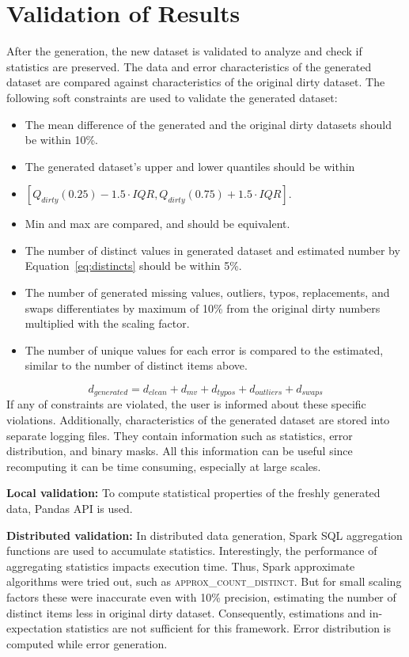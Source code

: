 \section{Validation of Results}
\label{sec:validation}
After the generation, the new dataset is validated to analyze and check if statistics are preserved. 
The data and error characteristics of the generated dataset are compared against characteristics of the original dirty dataset.
The following soft constraints are used to validate the generated dataset:
\begin{itemize}
    \item The mean difference of the generated and the original dirty datasets should be within 10\%.
    \item The generated dataset's upper and lower quantiles should be within 
    \item[~]$[Q_{dirty}(0.25) - 1.5\cdot IQR, Q_{dirty}(0.75) + 1.5\cdot IQR]$.
    \item Min and max are compared, and should be equivalent.
    \item The number of distinct values in generated dataset and estimated number by Equation~\ref{eq:distincts} should be within 5\%.
    \item The number of generated missing values, outliers, typos, replacements, and swaps differentiates by maximum  of 10\% from the original dirty numbers multiplied with the scaling factor.
    \item The number of unique values for each error is compared to the estimated, similar to the number of distinct items above.
\end{itemize}

\begin{equation}
\label{eq:distincts}
d_{generated} = d_{clean} + d_{mv} + d_{typos} + d_{outliers} + d_{swaps}
\end{equation}
If any of constraints are violated, the user is informed about these specific violations. 
Additionally, characteristics of the generated dataset are stored into separate logging files. 
They contain information such as statistics, error distribution, and binary masks.
All this information can be useful since recomputing it can be time consuming, especially at large scales.

\textbf{Local validation:} To compute statistical properties of the freshly generated data, Pandas API is used.

\textbf{Distributed validation:} 
In distributed data generation, Spark SQL aggregation functions are used to accumulate statistics.
Interestingly, the performance of aggregating statistics impacts execution time. 
Thus, Spark approximate algorithms were tried out, such as \textsc{approx\_count\_distinct}.
But for small scaling factors these were inaccurate even with 10\% precision, estimating the number of distinct items less in original dirty dataset.
Consequently, estimations and in-expectation statistics are not sufficient for this framework.
Error distribution is computed while error generation.